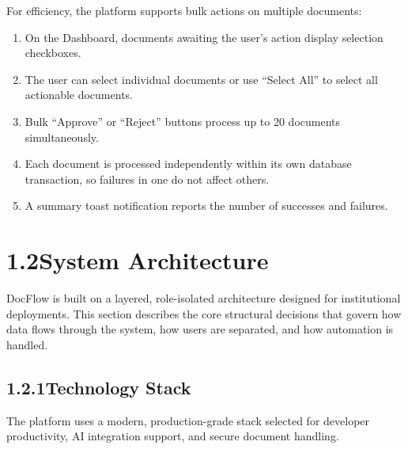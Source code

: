 \documentclass[12pt,a4paper]{report}
\begin{document}
For efficiency, the platform supports bulk actions on multiple documents:

\begin{enumerate}
    \item On the Dashboard, documents awaiting the user's action display selection checkboxes.
    \item The user can select individual documents or use ``Select All'' to select all actionable documents.
    \item Bulk ``Approve'' or ``Reject'' buttons process up to 20 documents simultaneously.
    \item Each document is processed independently within its own database transaction, so failures in one do not affect others.
    \item A summary toast notification reports the number of successes and failures.
\end{enumerate}

\section*{1.2\quad System Architecture}

DocFlow is built on a layered, role-isolated architecture designed for institutional deployments. This section describes the core structural decisions that govern how data flows through the system, how users are separated, and how automation is handled.

\subsection*{1.2.1\quad Technology Stack}

The platform uses a modern, production-grade stack selected for developer productivity, AI integration support, and secure document handling.
\end{document}
